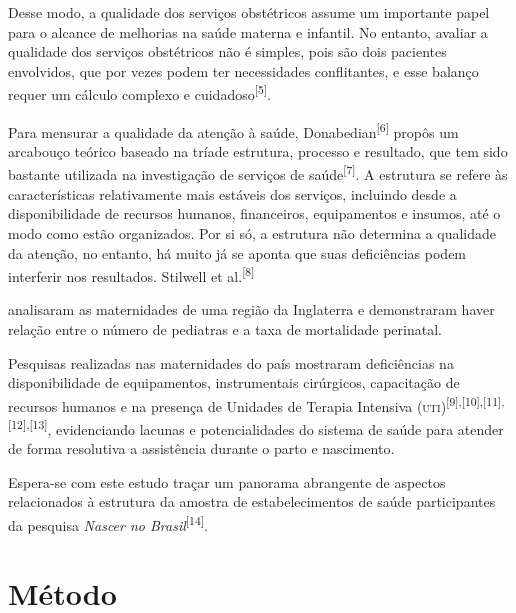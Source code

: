 \documentclass{article}
\begin{document}
Desse modo, a qualidade dos serviços obstétricos assume um importante papel para
o
alcance de melhorias na saúde materna e infantil. No entanto, avaliar a
qualidade
dos serviços obstétricos não é simples, pois são dois pacientes envolvidos, que
por
vezes podem ter necessidades conflitantes, e esse balanço requer um cálculo
complexo
e cuidadoso\textsuperscript{[}\textsuperscript{5}\textsuperscript{]}.

Para mensurar a qualidade da atenção à saúde, Donabedian\textsuperscript{[}\textsuperscript{6}\textsuperscript{]}
propôs um arcabouço teórico baseado na tríade
estrutura, processo e resultado, que tem sido bastante utilizada na investigação
de
serviços de saúde\textsuperscript{[}\textsuperscript{7}\textsuperscript{]}. A estrutura se
refere às características relativamente mais estáveis dos serviços, incluindo
desde
a disponibilidade de recursos humanos, financeiros, equipamentos e insumos, até
o
modo como estão organizados. Por si só, a estrutura não determina a qualidade da
atenção, no entanto, há muito já se aponta que suas deficiências podem
interferir
nos resultados. Stilwell et al.\textsuperscript{[}\textsuperscript{8}\textsuperscript{]}

analisaram as maternidades de uma região da Inglaterra e demonstraram haver
relação
entre o número de pediatras e a taxa de mortalidade perinatal.

Pesquisas realizadas nas maternidades do país mostraram deficiências na
disponibilidade de equipamentos, instrumentais cirúrgicos, capacitação de
recursos
humanos e na presença de Unidades de Terapia Intensiva (\textsc{uti})\textsuperscript{[}\textsuperscript{9}\textsuperscript{]}\textsuperscript{,}\textsuperscript{[}\textsuperscript{10}\textsuperscript{]}\textsuperscript{,}\textsuperscript{[}\textsuperscript{11}\textsuperscript{]}\textsuperscript{,}\textsuperscript{[}\textsuperscript{12}\textsuperscript{]}\textsuperscript{,}\textsuperscript{[}\textsuperscript{13}\textsuperscript{]}, evidenciando lacunas e potencialidades do sistema de
saúde para atender de forma resolutiva a assistência durante o parto e
nascimento.

Espera-se com este estudo traçar um panorama abrangente de aspectos relacionados
à
estrutura da amostra de estabelecimentos de saúde participantes da pesquisa
\textit{Nascer no Brasil}\textsuperscript{[}\textsuperscript{14}\textsuperscript{]}.

\section{Método}
\end{document}
